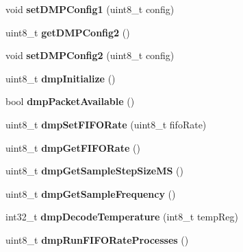 \begin{DoxyCompactItemize}
\mbox{\label{classMPU6050_a0126b95e4074de16bb61d9c4e4cf837f}} 
void {\bfseries set\+D\+M\+P\+Config1} (uint8\+\_\+t config)
\item 
\mbox{\label{classMPU6050_a29594027f88c291708a38fba67c4ecd5}} 
uint8\+\_\+t {\bfseries get\+D\+M\+P\+Config2} ()
\item 
\mbox{\label{classMPU6050_aea90c3e6a6666f070f7833a913cfa821}} 
void {\bfseries set\+D\+M\+P\+Config2} (uint8\+\_\+t config)
\item 
\mbox{\label{classMPU6050_a8b97688e8dd18be09865c2a31c4f3fe9}} 
uint8\+\_\+t {\bfseries dmp\+Initialize} ()
\item 
\mbox{\label{classMPU6050_acac466f057c9ac7797a46c00cad66387}} 
bool {\bfseries dmp\+Packet\+Available} ()
\item 
\mbox{\label{classMPU6050_a38853416eedf4074d15bc0ea4da47bd9}} 
uint8\+\_\+t {\bfseries dmp\+Set\+F\+I\+F\+O\+Rate} (uint8\+\_\+t fifo\+Rate)
\item 
\mbox{\label{classMPU6050_abe2e585ddbb8ed4dd06287b97e399725}} 
uint8\+\_\+t {\bfseries dmp\+Get\+F\+I\+F\+O\+Rate} ()
\item 
\mbox{\label{classMPU6050_a4f08483cb6b6f9917f602290fa4aee1b}} 
uint8\+\_\+t {\bfseries dmp\+Get\+Sample\+Step\+Size\+MS} ()
\item 
\mbox{\label{classMPU6050_a88b471672ecfe54e46868ab985d8d82b}} 
uint8\+\_\+t {\bfseries dmp\+Get\+Sample\+Frequency} ()
\item 
\mbox{\label{classMPU6050_ae15d6ac608ea2f4758aecd3a884e6014}} 
int32\+\_\+t {\bfseries dmp\+Decode\+Temperature} (int8\+\_\+t temp\+Reg)
\item 
\mbox{\label{classMPU6050_ab3e86446b6ac00436727db482069a5e5}} 
uint8\+\_\+t {\bfseries dmp\+Run\+F\+I\+F\+O\+Rate\+Processes} ()
\item 
\mbox{\label{classMPU6050_ac0f184549296f18d3f5a84a1a0e14be2}} 

\end{DoxyCompactItemize}
